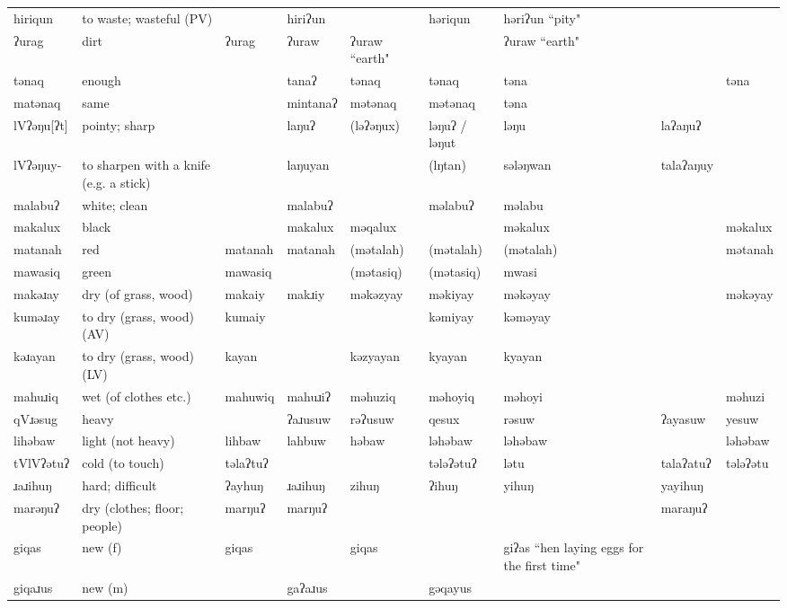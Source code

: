 \begin{landscape}
\begin{longtable}{*{9}{p{}}}
\text{*}hiriqun & to waste; wasteful (PV) &  & hiriʔun &  & həriqun & həriʔun ``pity" &  & \\
\text{*}ʔurag & dirt & ʔurag & ʔuraw & ʔuraw ``earth" &  & ʔuraw ``earth" &  & \\
\text{*}tənaq & enough &  & tanaʔ & tənaq & tənaq & təna &  & təna\\
\text{*}matənaq & same &  & mintanaʔ & mətənaq & mətənaq & təna &  & \\
\text{*}lVʔəŋu[ʔt] & pointy; sharp &  & laŋuʔ & (ləʔəŋux) & ləŋuʔ / ləŋut & ləŋu & laʔaŋuʔ & \\
\text{*}lVʔəŋuy- & to sharpen with a knife (e.g. a stick) &  & laŋuyan &  & (lŋtan) & sələŋwan & talaʔaŋuy & \\
\text{*}malabuʔ & white; clean &  & malabuʔ &  & məlabuʔ & məlabu &  & \\
\text{*}makalux & black &  & makalux & məqalux &  & məkalux &  & məkalux\\
\text{*}matanah & red & matanah & matanah & (mətalah) & (mətalah) & (mətalah) &  & mətanah\\
\text{*}mawasiq & green & mawasiq &  & (mətasiq) & (mətasiq) & mwasi &  & \\
\text{*}makəɹay & dry (of grass, wood) & makaiy & makɹiy & məkəzyay & məkiyay & məkəyay &  & məkəyay\\
\text{*}kuməɹay & to dry (grass, wood) (AV) & kumaiy &  &  & kəmiyay & kəməyay &  & \\
\text{*}kəɹayan & to dry (grass, wood) (LV) & kayan &  & kəzyayan & kyayan & kyayan &  & \\
\text{*}mahuɹiq & wet (of clothes etc.) & mahuwiq & mahuɹiʔ & məhuziq & məhoyiq & məhoyi &  & məhuzi\\
\text{*}qVɹəsug & heavy &  & ʔaɹusuw & rəʔusuw & qesux & rəsuw & ʔayasuw & yesuw\\
\text{*}lihəbaw & light (not heavy) & lihbaw & lahbuw & həbaw & ləhəbaw & ləhəbaw &  & ləhəbaw\\
\text{*}tVlVʔətuʔ & cold (to touch) & təlaʔtuʔ &  &  & tələʔətuʔ & lətu & talaʔatuʔ & tələʔətu\\
\text{*}ɹaɹihuŋ & hard; difficult & ʔayhuŋ & ɹaɹihuŋ & zihuŋ & ʔihuŋ & yihuŋ & yayihuŋ & \\
\text{*}marəŋuʔ & dry (clothes; floor; people) & marŋuʔ & marŋuʔ &  &  &  & maraŋuʔ & \\
\text{*}giqas & new (f) & giqas &  & giqas &  & giʔas ``hen laying eggs for the first time" &  & \\
\text{*}giqaɹus & new (m) &  & gaʔaɹus &  & gəqayus &  &  & \\

\end{longtable}
\end{landscape}
